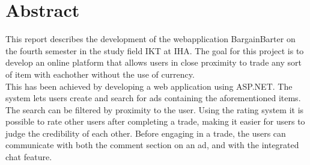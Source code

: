 \section{Abstract}
This report describes the development of the webapplication BargainBarter on the fourth semester in the study field IKT at IHA. The goal for this project is to develop an online platform that allows users in close proximity to trade any sort of item with eachother without the use of currency. 
\\This has been achieved by developing a web application using ASP.NET. The system lets users create and search for ads containing the aforementioned items. The search can be filtered by proximity to the user. Using the rating system it is possible to rate other users after completing a trade, making it easier for users to judge the credibility of each other. Before engaging in a trade, the users can communicate with both the comment section on an ad, and with the integrated chat feature.




